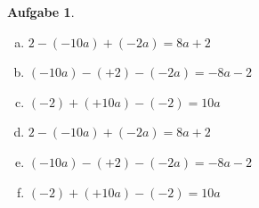 \documentclass[12pt,fleqn]{article}
\theoremstyle{aufg}
\newtheorem{aufgabe}{Aufgabe}
\theoremstyle{bsp}
\begin{document}
\begin{flushleft}
\begin{aufgabe}
\begin{multicols}{3} 
\begin{enumerate}[a)] 
\item 
$2-(-10a)+(-2a)=8 a + 2$
\item 
$(-10a)-(+2)-(-2a)=- 8 a - 2$
\item 
$(-2)+(+10a)-(-2)=10 a$
\item 
$2-(-10a)+(-2a)=8 a + 2$
\item 
$(-10a)-(+2)-(-2a)=- 8 a - 2$
\item 
$(-2)+(+10a)-(-2)=10 a$
\end{enumerate} 
\end{multicols} 
\end{aufgabe} 
\end{flushleft} 
\end{document}
